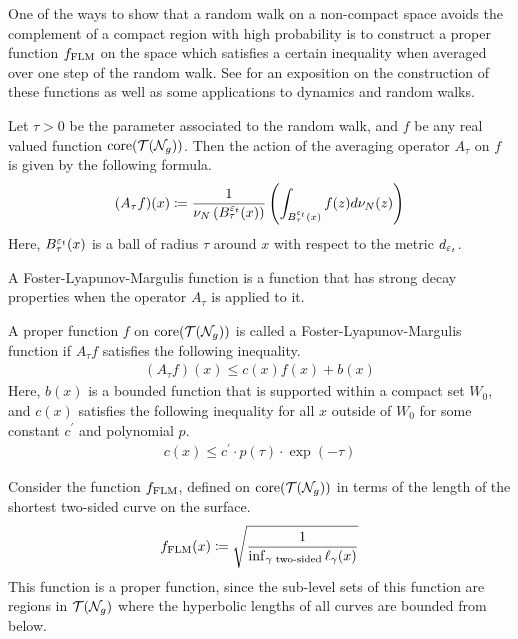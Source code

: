 \documentclass[12pt, reqno]{amsart}
\begin{document}
One of the ways to show that a random walk on a non-compact space avoids the complement of a compact region with high probability is to construct a proper function $f_{\mathrm{FLM}}$ on the space which satisfies a certain inequality when averaged over one step of the random walk.
See \textcite{EskinMozes+2022+342+361} for an exposition on the construction of these functions as well as some applications to dynamics and random walks.

\begin{definition}
  Let $\tau > 0$ be the parameter associated to the random walk, and $f$ be any real valued function $\mathrm{core}(\mathcal{T}(\mathcal{N}_g))$.
  Then the action of the averaging operator $A_{\tau}$ on $f$ is given by the following formula.
  \begin{align*}
    (A_{\tau}f)(x) \coloneqq \frac{1}{\nu_N\left( B_{\tau}^{\varepsilon_t}(x) \right)} \left( \int_{B_{\tau}^{\varepsilon_t}(x)} f(z) d\nu_N(z) \right)
  \end{align*}
  Here, $B_{\tau}^{\varepsilon_t}(x)$ is a ball of radius $\tau$ around $x$ with respect to the metric $d_{\varepsilon_t}$.
\end{definition}

A Foster-Lyapunov-Margulis function is a function that has strong decay properties when the operator $A_{\tau}$ is applied to it.

\begin{definition}
  \label{defn:flm}
  A proper function $f$ on $\mathrm{core}(\mathcal{T}(\mathcal{N}_g))$ is called a Foster-Lyapunov-Margulis function if $A_{\tau}f$ satisfies the following inequality.
  \begin{align*}
    (A_{\tau}f)(x) \leq c(x) f(x) + b(x)
  \end{align*}
  Here, $b(x)$ is a bounded function that is supported within a compact set $W_0$, and $c(x)$ satisfies the following inequality for all $x$ outside of $W_0$ for some constant $c^{\prime}$ and polynomial $p$.
  \begin{align*}
    c(x) \leq c^{\prime} \cdot p(\tau) \cdot \exp(-\tau)
  \end{align*}
\end{definition}

Consider the function $f_{\mathrm{FLM}}$, defined on $\mathrm{core}(\mathcal{T}(\mathcal{N}_g))$ in terms of the length of the shortest two-sided curve on the surface.
\begin{align*}
  f_{\mathrm{FLM}}(x) \coloneqq \sqrt{\frac{1}{\inf_{\text{$\gamma$ two-sided}}\ell_{\gamma}(x)}}
\end{align*}
This function is a proper function, since the sub-level sets of this function are regions in $\mathcal{T}(\mathcal{N}_g)$ where the hyperbolic lengths of all curves are bounded from below.
\end{document}
